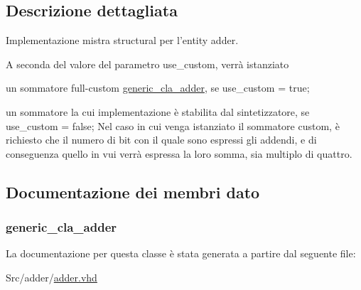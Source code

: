 \subsection{Descrizione dettagliata}
Implementazione mistra structural per l'entity adder. 

A seconda del valore del parametro use\+\_\+custom, verrà istanziato
\begin{DoxyItemize}
\item un sommatore full-\/custom \hyperlink{classgeneric__cla__adder}{generic\+\_\+cla\+\_\+adder}, se use\+\_\+custom = true;
\item un sommatore la cui implementazione è stabilita dal sintetizzatore, se use\+\_\+custom = false; Nel caso in cui venga istanziato il sommatore custom, è richiesto che il numero di bit con il quale sono espressi gli addendi, e di conseguenza quello in vui verrà espressa la loro somma, sia multiplo di quattro. 
\end{DoxyItemize}

\subsection{Documentazione dei membri dato}
\hypertarget{classadder_1_1structural_a94015e32a32cd4c5be09b1ddde822259}{
\subsubsection[{cla\+\_\+adder}]{ {\bfseries \textcolor{vhdlchar}{generic\+\_\+cla\+\_\+adder}\textcolor{vhdlchar}{ }} \hspace{0.3cm}{\ttfamily [Instantiation]}}}\label{classadder_1_1structural_a94015e32a32cd4c5be09b1ddde822259}


La documentazione per questa classe è stata generata a partire dal seguente file\+:\begin{DoxyCompactItemize}
\item 
Src/adder/\hyperlink{adder_8vhd}{adder.\+vhd}\end{DoxyCompactItemize}
